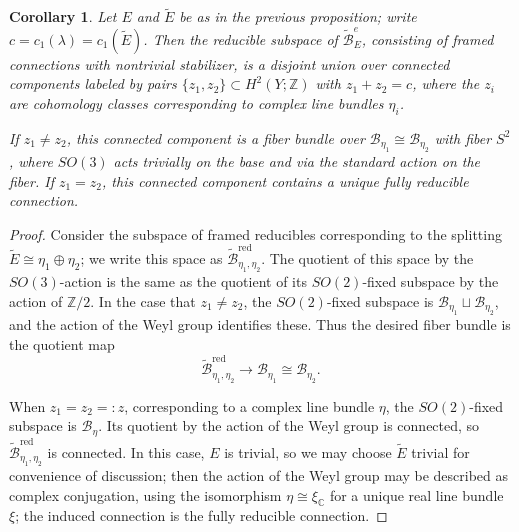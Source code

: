 \documentclass{memo-l}
\newtheorem{corollary}[theorem]{Corollary}
\theoremstyle{definition}
\theoremstyle{remark}
\numberwithin{section}{chapter}
\numberwithin{equation}{chapter}
\begin{document}
\begin{corollary}\label{orbits1}Let $E$ and $\tilde E$ be as in the previous proposition; write $c = c_1(\lambda) = c_1(\tilde E)$. Then the reducible subspace of $\widetilde{\mathcal B}^e_E$, consisting of framed connections with nontrivial stabilizer, is a disjoint union over connected components labeled by pairs $\{z_1, z_2\} \subset H^2(Y;\mathbb Z)$ with $z_1 + z_2 = c$, where the $z_i$ are cohomology classes corresponding to complex line bundles $\eta_i$.

If $z_1 \neq z_2$, this connected component is a fiber bundle over $\mathcal B_{\eta_1}\cong \mathcal B_{\eta_2}$ with fiber $S^2$, where $SO(3)$ acts trivially on the base and via the standard action on the fiber. 
If $z_1 = z_2$, this connected component contains a unique fully reducible connection.
\end{corollary}

\begin{proof}Consider the subspace of framed reducibles corresponding to the splitting $\tilde E \cong \eta_1 \oplus \eta_2$; we write this space as $\widetilde{\mathcal B}^{\text{red}}_{\eta_1, \eta_2}$. The quotient of this space by the $SO(3)$-action is the same as the quotient of its $SO(2)$-fixed subspace by the action of $\mathbb Z/2$. In the case that $z_1 \neq z_2$, the $SO(2)$-fixed subspace is $\mathcal B_{\eta_1} \sqcup \mathcal B_{\eta_2}$, and the action of the Weyl group identifies these. Thus the desired fiber bundle is the quotient map $$\widetilde{\mathcal B}^{\text{red}}_{\eta_1, \eta_2} \to \mathcal B_{\eta_1} \cong \mathcal B_{\eta_2}.$$ 

When $z_1 = z_2 =: z$, corresponding to a complex line bundle $\eta$, the $SO(2)$-fixed subspace is $\mathcal B_{\eta}$. Its quotient by the action of the Weyl group is connected, so $\widetilde{\mathcal B}^{\text{red}}_{\eta_1, \eta_2}$ is connected. In this case, $E$ is trivial, so we may choose $\tilde E$ trivial for convenience of discussion; then the action of the Weyl group may be described as complex conjugation, using the isomorphism $\eta \cong \xi_{\mathbb C}$ for a unique real line bundle $\xi$; the induced connection is the fully reducible connection.
\end{proof}
\end{document}
